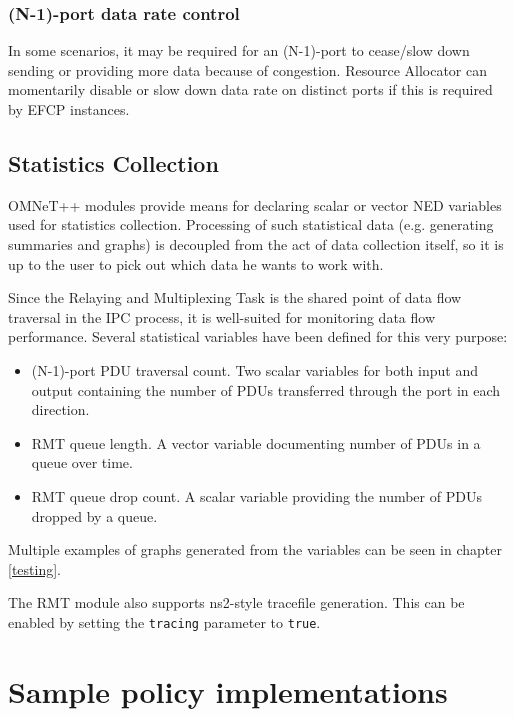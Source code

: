             \subsubsection{(N-1)-port data rate control}

                In some scenarios, it may be required for an (N-1)-port to cease/slow down sending or providing more data because of congestion. Resource Allocator can momentarily disable or slow down data rate on distinct ports if this is required by EFCP instances.


        \subsection{Statistics Collection}

            OMNeT++ modules provide means for declaring scalar or vector NED variables used for statistics collection. Processing of such statistical data (e.g. generating summaries and graphs) is decoupled from the act of data collection itself, so it is up to the user to pick out which data he wants to work with.

            Since the Relaying and Multiplexing Task is the shared point of data flow traversal in the IPC process, it is well-suited for monitoring data flow performance. Several statistical variables have been defined for this very purpose:

            \begin{itemize}
                \item (N-1)-port PDU traversal count. Two scalar variables for both input and output containing the number of PDUs transferred through the port in each direction.
                \item RMT queue length. A vector variable documenting number of PDUs in a queue over time.
                \item RMT queue drop count. A scalar variable providing the number of PDUs dropped by a queue.
            \end{itemize}

            Multiple examples of graphs generated from the variables can be seen in chapter \ref{testing}.

            The RMT module also supports ns2-style tracefile generation. This can be enabled by setting the \texttt{tracing} parameter to \texttt{true}.

    \section{Sample policy implementations}

